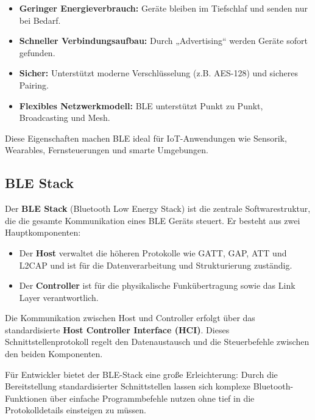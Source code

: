 	\begin{itemize}
		\item \textbf{Geringer Energieverbrauch:} Geräte bleiben im Tiefschlaf und senden nur bei Bedarf.
		\item \textbf{Schneller Verbindungsaufbau:} Durch „Advertising“ werden Geräte sofort gefunden.
		\item \textbf{Sicher:} Unterstützt moderne Verschlüsselung (z.B. AES-128) und sicheres Pairing.
		\item \textbf{Flexibles Netzwerkmodell:} BLE unterstützt Punkt zu Punkt, Broadcasting und Mesh.
	\end{itemize}

	Diese Eigenschaften machen BLE ideal für IoT-Anwendungen wie Sensorik, Wearables, Fernsteuerungen und smarte Umgebungen.
	\cite{Kumar.2023}

	\subsection{BLE Stack}
	Der \textbf{BLE Stack} (Bluetooth Low Energy Stack) ist die zentrale Softwarestruktur, die die gesamte Kommunikation eines BLE Geräts steuert. Er besteht aus zwei Hauptkomponenten:

	\begin{itemize}
		\item Der \textbf{Host} verwaltet die höheren Protokolle wie GATT, GAP, ATT und L2CAP und ist für die Datenverarbeitung und Strukturierung zuständig.
		\item Der \textbf{Controller} ist für die physikalische Funkübertragung sowie das Link Layer verantwortlich.
	\end{itemize}

	Die Kommunikation zwischen Host und Controller erfolgt über das standardisierte \textbf{Host Controller Interface (HCI)}. Dieses Schnittstellenprotokoll regelt den Datenaustausch und die Steuerbefehle zwischen den beiden Komponenten.
	
	Für Entwickler bietet der BLE-Stack eine große Erleichterung: Durch die Bereitstellung standardisierter Schnittstellen lassen sich komplexe Bluetooth-Funktionen über einfache Programmbefehle nutzen  ohne tief in die Protokolldetails einsteigen zu müssen. \cite{Kumar.2023}
	
